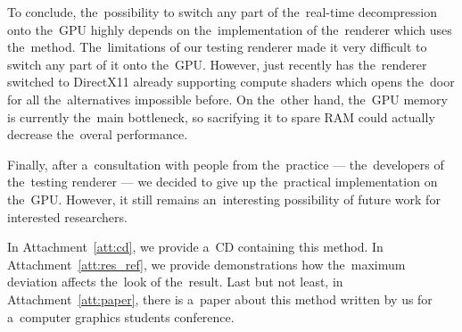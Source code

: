 To conclude, the~possibility to switch any part of the~real-time decompression onto the~GPU highly depends on the~implementation of the~renderer which uses the~method. The~limitations of our testing renderer made it very difficult to switch any part of it onto the~GPU. However, just recently has the~renderer switched to DirectX11 already supporting compute shaders which opens the~door for all the~alternatives impossible before. On the~other hand, the~GPU memory is currently the~main bottleneck, so sacrifying it to spare RAM could actually decrease the~overal performance.

Finally, after a~consultation with people from the~practice --- the~developers of the~testing renderer --- we decided to give up the~practical implementation on the~GPU. However, it still remains an~interesting possibility of future work for interested researchers.

In Attachment~\ref{att:cd}, we provide a~CD containing this method. In Attachment~\ref{att:res_ref}, we provide demonstrations how the~maximum deviation affects the~look of the~result. Last but not least, in Attachment~\ref{att:paper}, there is a~paper about this method written by us for a~computer graphics students conference.